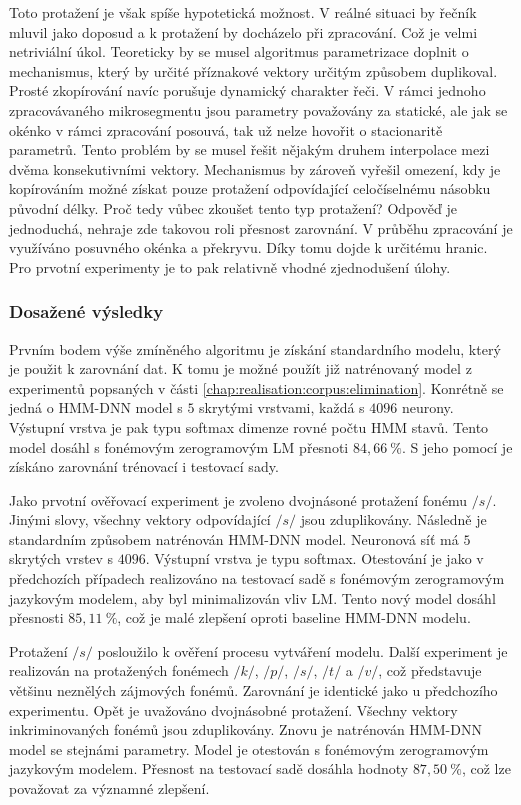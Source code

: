 Toto protažení je však spíše hypotetická možnost. V reálné situaci by řečník mluvil jako doposud a k protažení by docházelo při zpracování. Což je velmi netriviální úkol. Teoreticky by se musel algoritmus parametrizace doplnit o mechanismus, který by určité příznakové vektory určitým způsobem duplikoval. Prosté zkopírování navíc porušuje dynamický charakter řeči. V rámci jednoho zpracovávaného mikrosegmentu jsou parametry považovány za statické, ale jak se okénko v rámci zpracování posouvá, tak už nelze hovořit o stacionaritě parametrů. Tento problém by se musel řešit nějakým druhem interpolace mezi dvěma konsekutivními vektory. Mechanismus by zároveň vyřešil omezení, kdy je kopírováním možné získat pouze protažení odpovídající celočíselnému násobku původní délky. Proč tedy vůbec zkoušet tento typ protažení? Odpověď je jednoduchá, nehraje zde takovou roli přesnost zarovnání. V průběhu zpracování je využíváno posuvného okénka a překryvu. Díky tomu dojde k určitému  hranic. Pro prvotní experimenty je to pak relativně vhodné zjednodušení úlohy.

\subsubsection{Dosažené výsledky}

Prvním bodem výše zmíněného algoritmu je získání standardního modelu, který je použit k zarovnání dat. K tomu je možné použít již natrénovaný model z experimentů popsaných v části \ref{chap:realisation:corpus:elimination}. Konrétně se jedná o HMM-DNN model s $5$ skrytými vrstvami, každá s $4096$ neurony. Výstupní vrstva je pak typu softmax dimenze rovné počtu HMM stavů. Tento model dosáhl s fonémovým zerogramovým LM přesnoti $84,66\ \%$. S jeho pomocí je získáno zarovnání trénovací i testovací sady.

Jako prvotní ověřovací experiment je zvoleno dvojnásoné protažení fonému $/s/$. Jinými slovy, všechny vektory odpovídající $/s/$ jsou zduplikovány. Následně je standardním způsobem natrénován HMM-DNN model. Neuronová síť má $5$ skrytých vrstev s $4096$. Výstupní vrstva je typu softmax. Otestování je jako v předchozích případech realizováno na testovací sadě s fonémovým zerogramovým jazykovým modelem, aby byl minimalizován vliv LM. Tento nový model dosáhl přesnosti $85,11\ \%$, což je malé zlepšení oproti baseline HMM-DNN modelu.

Protažení $/s/$ posloužilo k ověření procesu vytváření modelu. Další experiment je realizován na protažených fonémech $/k/$, $/p/$, $/s/$, $/t/$ a $/v/$, což představuje většinu neznělých zájmových fonémů. Zarovnání je identické jako u předchozího experimentu. Opět je uvažováno dvojnásobné protažení. Všechny vektory inkriminovaných fonémů jsou zduplikovány. Znovu je natrénován HMM-DNN model se stejnámi parametry. Model je otestován s fonémovým zerogramovým jazykovým modelem. Přesnost na testovací sadě dosáhla hodnoty $87,50\ \%$, což lze považovat za významné zlepšení.

